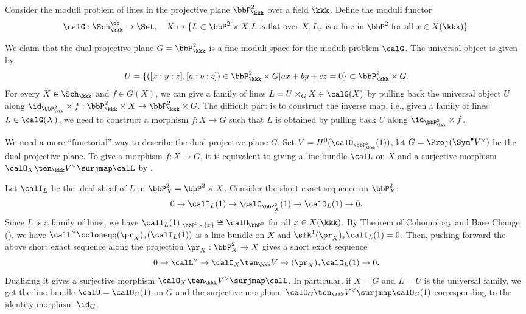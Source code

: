     \begin{example}\label{eg:moduli_of_lines_in_P2}
        Consider the moduli problem of lines in the projective plane \(\bbP_{\kkk}^2\) over a field \(\kkk\).
        Define the moduli functor
        \[
            \calG: \Sch_{\kkk}^{\op} \to \Set,\quad X \mapsto \{L \subset \bbP^2 \times X | L \text{ is flat over } X, L_x \text{ is a line in } \bbP^2 \text{ for all } x \in X(\kkk)\}.
        \]

        We claim that the dual projective plane \(G = \bbP_{\kkk}^2\) is a fine moduli space for the moduli problem \(\calG\).
        The universal object is given by 
        \[
            U = \{([x:y:z], [a:b:c]) \in \bbP_{\kkk}^2 \times G | ax + by + cz = 0\} \subset \bbP_{\kkk}^2 \times G.
        \]
        For every \(X \in \Sch_{\kkk}\) and \(f \in G(X)\), we can give a family of lines \(L = U \times_G X \in \calG(X)\) by pulling back the universal object \(U\) along \(\id_{\bbP_{\kkk}^2} \times f: \bbP_{\kkk}^2 \times X \to \bbP_{\kkk}^2 \times G\).
        The difficult part is to construct the inverse map, i.e., given a family of lines \(L \in \calG(X)\), we need to construct a morphism \(f: X \to G\) such that \(L\) is obtained by pulling back \(U\) along \(\id_{\bbP_{\kkk}^2} \times f\).

        We need a more ``functorial'' way to describe the dual projective plane \(G\).
        Set \(V = H^0(\calO_{\bbP_{\kkk}^2}(1))\), let \(G = \Proj (\Sym^{\bullet} V^{\vee})\) be the dual projective plane.
        To give a morphism \(f:X \to G\), it is equivalent to giving a line bundle \(\calL\) on \(X\) and a surjective morphism \(\calO_X \ten_\kkk V^{\vee} \surjmap \calL\) by .
        
        Let \(\calI_L\) be the ideal sheaf of \(L\) in \(\bbP_X^2 = \bbP^2 \times X\).
        Consider the short exact sequence on \(\bbP_X^2\):
        \[ 0 \to \calI_L(1) \to \calO_{\bbP_{X}^2}(1) \to \calO_{L}(1) \to 0. \]
        Since \(L\) is a family of lines, we have \(\calI_L(1)|_{\bbP^2 \times \{x\}} \cong \calO_{\bbP^2}\) for all \(x \in X(\kkk)\).
        By Theorem of Cohomology and Base Change (), we have \(\calL^\vee \coloneqq (\pr_X)_*(\calI_L(1))\) is a line bundle on \(X\) and \(\sfR^1(\pr_X)_*\calI_L(1) = 0\).
        Then, pushing forward the above short exact sequence along the projection \(\pr_X: \bbP_X^2 \to X\) gives a short exact sequence
        \[ 0 \to \calL^{\vee} \to \calO_X \ten_{\kkk} V \to (\pr_X)_*\calO_L(1) \to 0. \]
        Dualizing it gives a surjective morphism \(\calO_X \ten_{\kkk} V^{\vee} \surjmap \calL\).
        In particular, if \(X = G\) and \(L = U\) is the universal family, we get the line bundle \(\calU = \calO_G(1)\) on \(G\) and the surjective morphism \(\calO_G \ten_{\kkk} V^{\vee} \surjmap \calO_G(1)\) corresponding to the identity morphism \(\id_G\).


\end{example}
